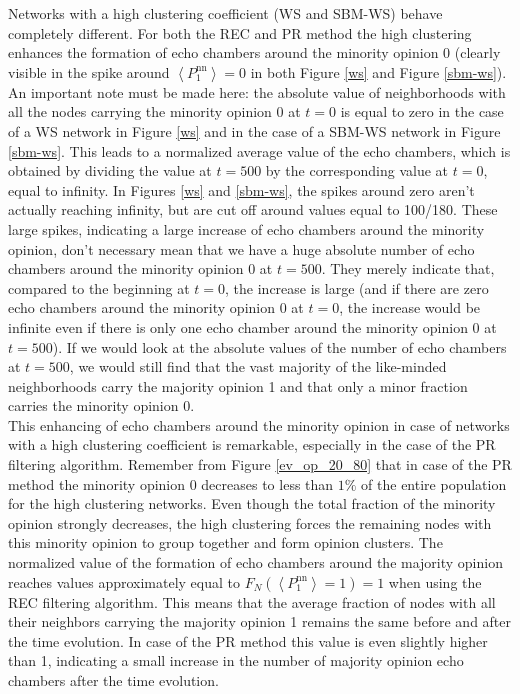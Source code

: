 \documentclass[11 pt , letterpaper , twoside , openright]{book}
\begin{document}
\newline
Networks with a high clustering coefficient (WS and SBM-WS) behave completely different. For both the REC and PR method the high clustering enhances the formation of echo chambers around the minority opinion 0 (clearly visible in the spike around $\left<P_1^{\text{nn}}\right> = 0$ in both Figure \ref{ws} and Figure \ref{sbm-ws}). An important note must be made here: the absolute value of neighborhoods with all the nodes carrying the minority opinion 0 at $t=0$ is equal to zero in the case of a WS network in Figure \ref{ws} and in the case of a SBM-WS network in Figure \ref{sbm-ws}. This leads to a normalized average value of the echo chambers, which is obtained by dividing the value at $t=500$ by the corresponding value at $t=0$, equal to infinity. In Figures \ref{ws} and \ref{sbm-ws}, the spikes around zero aren't actually reaching infinity, but are cut off around values equal to 100/180. These large spikes, indicating a large increase of echo chambers around the minority opinion, don't necessary mean that we have a huge absolute number of echo chambers around the minority opinion 0 at $t=500$. They merely indicate that, compared to the beginning at $t=0$, the increase is large (and if there are zero echo chambers around the minority opinion 0 at $t=0$, the increase would be infinite even if there is only one echo chamber around the minority opinion 0 at $t=500$). If we would look at the absolute values of the number of echo chambers at $t=500$, we would still find that the vast majority of the like-minded neighborhoods carry the majority opinion 1 and that only a minor fraction carries the minority opinion 0.\\
This enhancing of echo chambers around the minority opinion in case of networks with a high clustering coefficient is remarkable, especially in the case of the PR filtering algorithm. Remember from Figure \ref{ev_op_20_80} that in case of the PR method the minority opinion 0 decreases to less than $1 \%$ of the entire population for the high clustering networks. Even though the total fraction of the minority opinion strongly decreases, the high clustering forces the remaining nodes with this minority opinion to group together and form opinion clusters. The normalized value of the formation of echo chambers around the majority opinion reaches values approximately equal to $F_N(\left<P_1^{\text{nn}}\right> = 1) = 1$ when using the REC filtering algorithm. This means that the average fraction of nodes with all their neighbors carrying the majority opinion 1 remains the same before and after the time evolution. In case of the PR method this value is even slightly higher than 1, indicating a small increase in the number of majority opinion echo chambers after the time evolution. 
\end{document}
